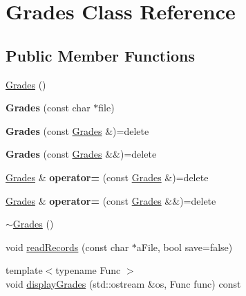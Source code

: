 \hypertarget{classGrades}{}\section{Grades Class Reference}
\label{classGrades}
\subsection*{Public Member Functions}
\begin{DoxyCompactItemize}
\item 
\mbox{\hyperlink{classGrades_a2bbc5a8c929c273e62fe6a8b442ad0db}{Grades}} ()
\item 
\mbox{\label{classGrades_acd4a639c3c0475a2f0a8da444887d12f}} 
{\bfseries Grades} (const char $\ast$file)
\item 
\mbox{\label{classGrades_a879f56245c7f9deac988b1c05d55834b}} 
{\bfseries Grades} (const \mbox{\hyperlink{classGrades}{Grades}} \&)=delete
\item 
\mbox{\label{classGrades_acc16ca4740ae5d3e21fb0872551af088}} 
{\bfseries Grades} (const \mbox{\hyperlink{classGrades}{Grades}} \&\&)=delete
\item 
\mbox{\label{classGrades_ab21a7375984e78538fd995f393b81fbc}} 
\mbox{\hyperlink{classGrades}{Grades}} \& {\bfseries operator=} (const \mbox{\hyperlink{classGrades}{Grades}} \&)=delete
\item 
\mbox{\label{classGrades_ac48c966160770994a68cabd92f9a915b}} 
\mbox{\hyperlink{classGrades}{Grades}} \& {\bfseries operator=} (const \mbox{\hyperlink{classGrades}{Grades}} \&\&)=delete
\item 
\mbox{\hyperlink{classGrades_a2838d5659c59892f54fa2d674cb68597}{$\sim$\+Grades}} ()
\item 
void \mbox{\hyperlink{classGrades_aa2979504b1668bd2d28d70c76697dd4d}{read\+Records}} (const char $\ast$a\+File, bool save=false)
\item 
{\footnotesize template$<$typename Func $>$ }\\void \mbox{\hyperlink{classGrades_a21957de7c89d7e51ef85b9d41d1264ef}{display\+Grades}} (std\+::ostream \&os, Func func) const
\end{DoxyCompactItemize}


